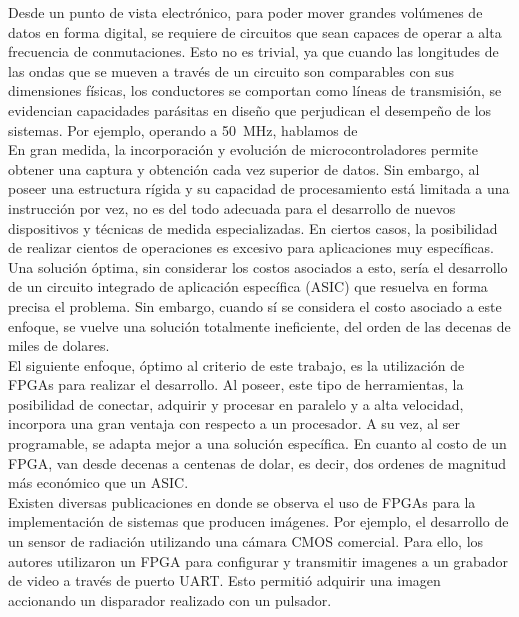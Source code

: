 Desde un punto de vista electrónico, para poder mover grandes volúmenes de datos en forma digital, se requiere de circuitos que sean capaces de operar a alta frecuencia de conmutaciones. Esto no es trivial, ya que cuando las longitudes de las ondas que se mueven a través de un circuito son comparables con sus dimensiones físicas, los conductores se comportan como líneas de transmisión, se evidencian capacidades parásitas en diseño que perjudican el desempeño de los sistemas. Por ejemplo, operando a \SI{50}{\mega\hertz}, hablamos de \\

En gran medida, la incorporación y evolución de microcontroladores permite obtener una captura y obtención cada vez superior de datos. Sin embargo, al poseer una estructura rígida y su capacidad de procesamiento está limitada a una instrucción por vez, no es del todo adecuada para el desarrollo de nuevos dispositivos y técnicas de medida especializadas. En ciertos casos, la posibilidad de realizar cientos de operaciones es excesivo para aplicaciones muy específicas. Una solución óptima, sin considerar los costos asociados a esto, sería el desarrollo de un circuito integrado de aplicación específica (ASIC) que resuelva en forma precisa el problema. Sin embargo, cuando sí se considera el costo asociado a este enfoque, se vuelve una solución totalmente ineficiente, del orden de las decenas de miles de dolares.\\

El siguiente enfoque, óptimo al criterio de este trabajo, es la utilización de FPGAs para realizar el desarrollo. Al poseer, este tipo de herramientas, la posibilidad de conectar, adquirir y procesar en paralelo y a alta velocidad, incorpora una gran ventaja con respecto a un procesador. A su vez, al ser programable, se adapta mejor a una solución específica. En cuanto al costo de un FPGA, van desde decenas a centenas de dolar, es decir, dos ordenes de magnitud más económico que un ASIC.\\

Existen diversas publicaciones en donde se observa el uso de FPGAs para la implementación de sistemas que producen imágenes. Por ejemplo, el desarrollo de un sensor de radiación utilizando una cámara CMOS comercial. Para ello, los autores utilizaron un FPGA para configurar y transmitir imagenes a un grabador de video a través de puerto UART. Esto permitió adquirir una imagen accionando un disparador realizado con un pulsador\cite{Perez2017}.\\

